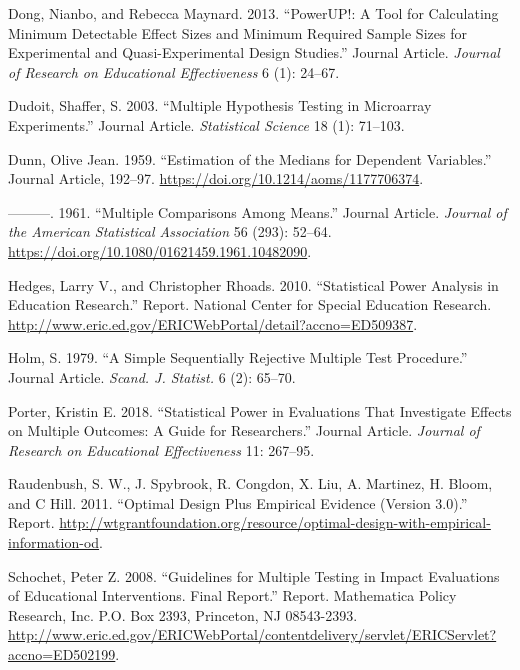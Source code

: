 \documentclass[
]{article}
\newlength{\cslhangindent}
\newlength{\cslentryspacingunit} %
\newenvironment{CSLReferences}[2] %
 {%
  \setlength{\parindent}{0pt}
  \ifodd #1
  \let\oldpar\par
  \def\par{\hangindent=\cslhangindent\oldpar}
  \fi
  \setlength{\parskip}{#2\cslentryspacingunit}
 }%
 {}
\begin{document}
\begin{CSLReferences}{1}{0}
\leavevmode{}%
Dong, Nianbo, and Rebecca Maynard. 2013. {``PowerUP!: A Tool for
Calculating Minimum Detectable Effect Sizes and Minimum Required Sample
Sizes for Experimental and Quasi-Experimental Design Studies.''} Journal
Article. \emph{Journal of Research on Educational Effectiveness} 6 (1):
24--67.

\leavevmode{}%
Dudoit, Shaffer, S. 2003. {``Multiple Hypothesis Testing in Microarray
Experiments.''} Journal Article. \emph{Statistical Science} 18 (1):
71--103.

\leavevmode{}%
Dunn, Olive Jean. 1959. {``Estimation of the Medians for Dependent
Variables.''} Journal Article, 192--97.
\url{https://doi.org/10.1214/aoms/1177706374}.

\leavevmode{}%
---------. 1961. {``Multiple Comparisons Among Means.''} Journal
Article. \emph{Journal of the American Statistical Association} 56
(293): 52--64. \url{https://doi.org/10.1080/01621459.1961.10482090}.

\leavevmode{}%
Hedges, Larry V., and Christopher Rhoads. 2010. {``Statistical Power
Analysis in Education Research.''} Report. National Center for Special
Education Research.
\url{http://www.eric.ed.gov/ERICWebPortal/detail?accno=ED509387}.

\leavevmode{}%
Holm, S. 1979. {``A Simple Sequentially Rejective Multiple Test
Procedure.''} Journal Article. \emph{Scand. J. Statist.} 6 (2): 65--70.

\leavevmode{}%
Porter, Kristin E. 2018. {``Statistical Power in Evaluations That
Investigate Effects on Multiple Outcomes: A Guide for Researchers.''}
Journal Article. \emph{Journal of Research on Educational Effectiveness}
11: 267--95.

\leavevmode{}%
Raudenbush, S. W., J. Spybrook, R. Congdon, X. Liu, A. Martinez, H.
Bloom, and C Hill. 2011. {``Optimal Design Plus Empirical Evidence
(Version 3.0).''} Report.
\url{http://wtgrantfoundation.org/resource/optimal-design-with-empirical-information-od}.

\leavevmode{}%
Schochet, Peter Z. 2008. {``Guidelines for Multiple Testing in Impact
Evaluations of Educational Interventions. Final Report.''} Report.
Mathematica Policy Research, Inc. P.O. Box 2393, Princeton, NJ
08543-2393.
\url{http://www.eric.ed.gov/ERICWebPortal/contentdelivery/servlet/ERICServlet?accno=ED502199}.


\end{CSLReferences}
\end{document}
